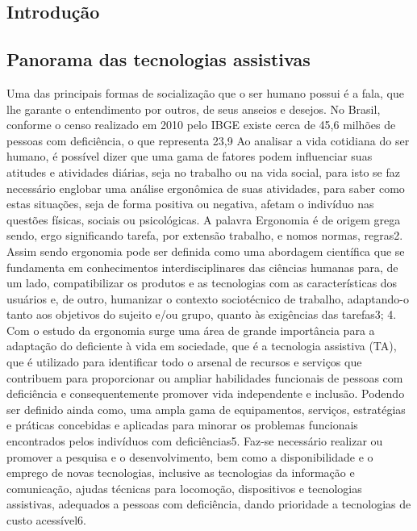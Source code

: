 \documentclass[twoside]{article}
\begin{document}
\begin{multicols}{2} %

\section{Introdução}
\subsection{Panorama das tecnologias assistivas}
Uma das principais formas de socialização que o ser humano possui é a fala, que lhe garante o entendimento por outros, de seus anseios e desejos. No Brasil, conforme o censo realizado em 2010 pelo IBGE existe cerca de 45,6 milhões de pessoas com deficiência, o que representa 23,9%
Ao analisar a vida cotidiana do ser humano, é possível dizer que uma gama de fatores podem influenciar suas atitudes e atividades diárias, seja no trabalho ou na vida social, para isto se faz necessário englobar uma análise ergonômica de suas atividades, para saber como estas situações, seja de forma positiva ou negativa, afetam o indivíduo nas questões físicas, sociais ou psicológicas.  A palavra Ergonomia é de origem grega sendo, ergo significando tarefa, por extensão trabalho, e nomos normas, regras2.
Assim sendo ergonomia pode ser definida como uma abordagem científica que se fundamenta em conhecimentos interdisciplinares das ciências humanas para, de um lado, compatibilizar os produtos e as tecnologias com as características dos usuários e, de outro, humanizar o contexto sociotécnico de trabalho, adaptando-o tanto aos objetivos do sujeito e/ou grupo, quanto às exigências das tarefas3; 4. Com o estudo da ergonomia surge uma área de grande importância para a adaptação do deficiente à vida em sociedade, que é a tecnologia assistiva (TA), que é utilizado para identificar todo o arsenal de recursos e serviços que contribuem para proporcionar ou ampliar habilidades funcionais de pessoas com deficiência e consequentemente promover vida independente e inclusão. Podendo ser definido ainda como, uma ampla gama de equipamentos, serviços, estratégias e práticas concebidas e aplicadas para minorar os problemas funcionais encontrados pelos indivíduos com deficiências5.
Faz-se necessário realizar ou promover a pesquisa e o desenvolvimento, bem como a disponibilidade e o emprego de novas tecnologias, inclusive as tecnologias da informação e comunicação, ajudas técnicas para locomoção, dispositivos e tecnologias assistivas, adequados a pessoas com deficiência, dando prioridade a tecnologias de custo acessível6.

\end{multicols}
\end{document}

